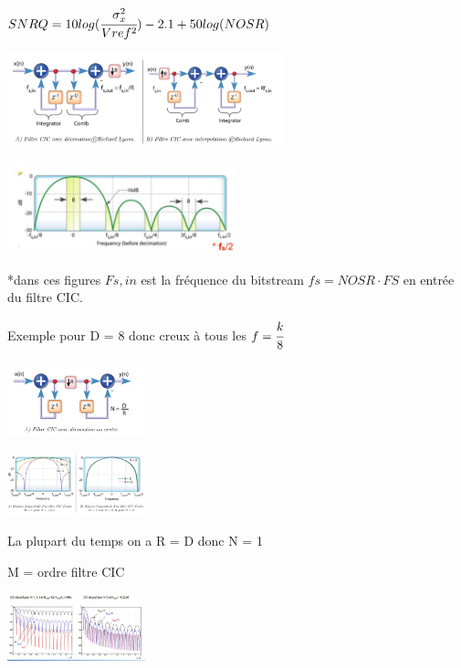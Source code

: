 $SNRQ = 10log(\cfrac{\sigma_x^2}{Vref^2})- 2.1  + 50log(NOSR)$

\hformbar


\vspace{-5mm}
\begin{center}
    \hspace{-2cm}    \includegraphics[width = 0.6\textwidth]{img/CIC_Z.JPG}
\end{center}

\vspace{-10mm}

\begin{center}
    \includegraphics[width = 0.5\textwidth]{img/sinus_card.JPG}
\end{center}

\vspace{-5mm}

*dans ces figures $Fs,in$ est la fréquence du bitstream $fs = NOSR \cdot FS$ en entrée du filtre CIC.

Exemple pour D = 8 donc creux à tous les $f =\cfrac{k}{8}$



\vspace{-3mm}

\begin{center}
    \includegraphics[width = 0.3\textwidth]{img/CIC_centre.JPG}
\end{center}


\vspace{-5mm}

\begin{center}
    \includegraphics[angle=90,width = 0.3\textwidth]{img/cic_avecDelta.JPG}
\end{center}

La plupart du temps on a R = D donc N = 1

M  = ordre filtre CIC
\begin{center}
    \includegraphics[angle=90,width = 0.3\textwidth]{img/Sook.JPG}
\end{center}